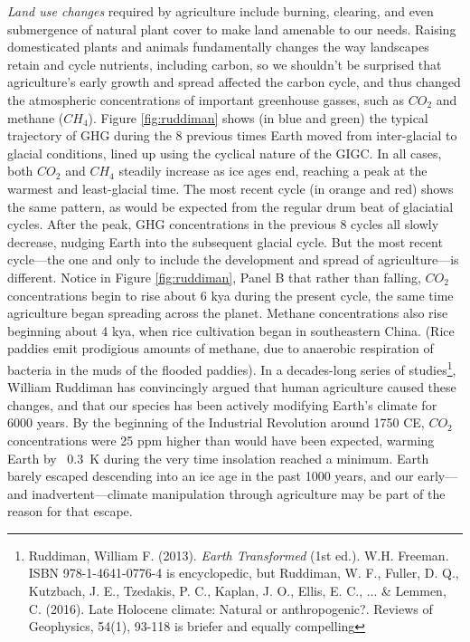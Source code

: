 \emph{Land use changes} required by agriculture include burning, clearing, and even submergence of natural plant cover to make land amenable to our needs. Raising domesticated plants and animals fundamentally changes the way landscapes retain and cycle nutrients, including carbon, so we shouldn't be surprised that agriculture's early growth and spread affected the carbon cycle, and thus changed the atmospheric concentrations of important greenhouse gasses, such as $CO_2$ and methane ($CH_4$). Figure \ref{fig:ruddiman} shows (in blue and green) the typical trajectory of GHG during the 8 previous times Earth moved from inter-glacial to glacial conditions, lined up using the cyclical nature of the GIGC. In all cases, both $CO_2$ and $CH_4$ steadily increase as ice ages end, reaching a peak at the warmest and least-glacial time. The most recent cycle (in orange and red) shows the same pattern, as would be expected from the regular drum beat of glaciatial cycles. After the peak, GHG concentrations in the previous 8 cycles all slowly decrease, nudging Earth into the subsequent glacial cycle. But the most recent cycle---the one and only to include the development and spread of agriculture---is different. Notice in Figure \ref{fig:ruddiman}, Panel B that rather than falling, $CO_2$ concentrations begin to rise about 6 kya during the present cycle, the same time agriculture began spreading across the planet. Methane concentrations also rise beginning about 4 kya, when rice cultivation began in southeastern China. (Rice paddies emit prodigious amounts of methane, due to anaerobic respiration of bacteria in the muds of the flooded paddies). In a decades-long series of studies\footnote{Ruddiman, William F. (2013). \textit{Earth Transformed} (1st ed.). W.H. Freeman. ISBN 978-1-4641-0776-4 is encyclopedic, but Ruddiman, W. F., Fuller, D. Q., Kutzbach, J. E., Tzedakis, P. C., Kaplan, J. O., Ellis, E. C., ... \& Lemmen, C. (2016). Late Holocene climate: Natural or anthropogenic?. Reviews of Geophysics, 54(1), 93-118 is briefer and equally compelling}, William Ruddiman has convincingly argued that human agriculture caused these changes, and that our species has been actively modifying Earth's climate for 6000 years. By the beginning of the Industrial Revolution around 1750 CE, $CO_2$ concentrations were 25 ppm higher than would have been expected, warming Earth by ~\SI{0.3}{\kelvin} during the very time insolation reached a minimum. Earth barely escaped descending into an ice age in the past 1000 years, and our early---and inadvertent---climate manipulation through agriculture may be part of the reason for that escape. \\
    

